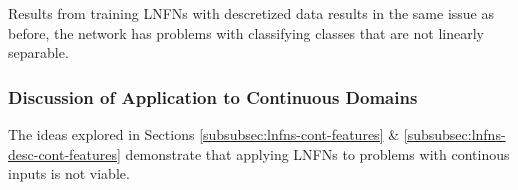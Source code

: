 Results from training LNFNs with descretized data results in the same issue as before, the network has problems with classifying classes that are not linearly separable.

\subsubsection{Discussion of Application to Continuous Domains}
The ideas explored in Sections \ref{subsubsec:lnfns-cont-features} \& \ref{subsubsec:lnfns-desc-cont-features} demonstrate that applying LNFNs to problems with continous inputs is not viable.